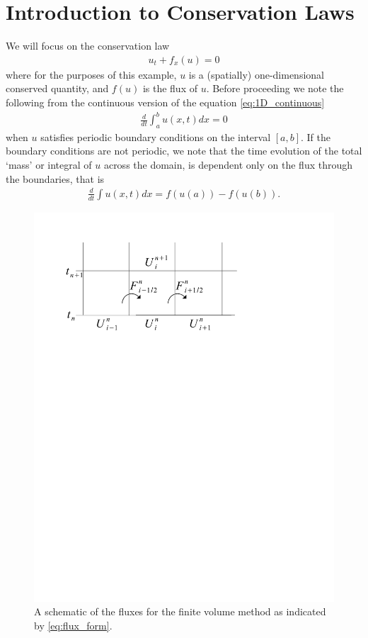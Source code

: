 \label{lab:finitevolume}

\section{Introduction to Conservation Laws}
We will focus on the conservation law
\begin{gather}\label{eq:1D_continuous}
u_t + f_x(u) = 0
\end{gather}
where for the purposes of this example, $u$ is a (spatially) one-dimensional conserved quantity, and $f(u)$ is the flux of $u$.  Before proceeding we note the following from the continuous version of the equation \eqref{eq:1D_continuous}
\begin{gather}
\frac{d}{dt}\int_a^b u(x,t) dx = 0
\end{gather}
when $u$ satisfies periodic boundary conditions on the interval $[a,b]$.  If the boundary conditions are not periodic, we note that the time evolution of the total `mass' or integral of $u$ across the domain, is dependent only on the flux through the boundaries, that is
\begin{gather}
\frac{d}{dt}\int u(x,t) dx = f(u(a))-f(u(b)).
\end{gather}

\begin{figure}[ht]
\centering
\includegraphics[trim= 20mm 195mm 0mm 30mm, clip]{flux_form.pdf}
\caption{A schematic of the fluxes for the finite volume method as indicated by \eqref{eq:flux_form}.}
\end{figure}

